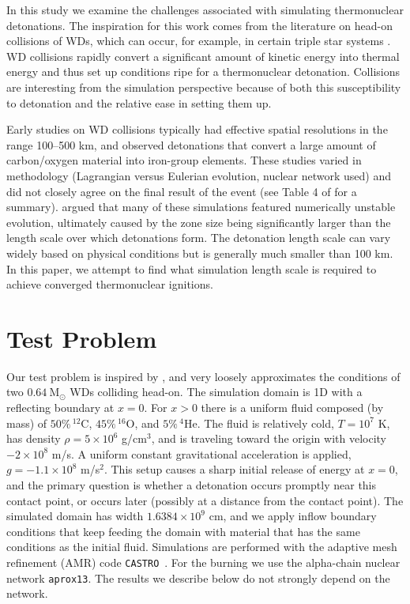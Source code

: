 \documentclass[twocolumn,numberedappendix]{../aastex62}
\newcommand{\msolar}{\mathrm{M}_\odot}
\newcommand{\castro}{\texttt{CASTRO}}
\begin{document}
In this study we examine the challenges associated with simulating thermonuclear detonations.
The inspiration for this work comes from the literature on head-on collisions of WDs,
which can occur, for example, in certain triple star systems \citep{thompson:2011,hamers:2013}.
WD collisions rapidly convert a significant amount of kinetic energy into thermal energy and
thus set up conditions ripe for a thermonuclear detonation. Collisions are interesting
from the simulation perspective because of both this susceptibility to detonation and
the relative ease in setting them up.

Early studies on WD collisions \citep{rosswog:2009,raskin:2010,loren-aguilar:2010,
hawley:2012,garcia-senz:2013} typically had effective spatial resolutions in the
range 100--500 km, and observed detonations that convert a large amount of
carbon/oxygen material into iron-group elements. These studies varied in methodology
(Lagrangian versus Eulerian evolution, nuclear network used) and did not closely agree
on the final result of the event (see Table 4 of \cite{garcia-senz:2013} for a summary).
\cite{kushnir:2013} argued that many of these simulations featured numerically unstable
evolution, ultimately caused by the zone size being significantly larger than the length
scale over which detonations form. The detonation length scale can vary widely based
on physical conditions \citep{seitenzahl:2009,garg:2017} but is generally much
smaller than 100 km. In this paper, we attempt to find what simulation length scale
is required to achieve converged thermonuclear ignitions.



\section{Test Problem}
\label{sec:collisions}

Our test problem is inspired by \cite{kushnir:2013}, and very loosely approximates the
conditions of two $0.64\ \msolar$ WDs colliding head-on. The simulation domain is 1D with a
reflecting boundary at $x = 0$. For $x > 0$ there is a uniform fluid composed (by mass)
of $50\%\, ^{12}$C, $45\%\, ^{16}$O, and $5\%\, ^{4}$He. The fluid is relatively cold,
$T = 10^7$ K, has density $\rho = 5 \times 10^6$ g/cm$^3$, and is traveling toward the
origin with velocity $-2 \times 10^8$ m/s. A uniform constant gravitational acceleration
is applied, $g = -1.1 \times 10^8$ m/s$^{2}$. This setup causes a sharp initial release
of energy at $x = 0$, and the primary question is whether a detonation occurs promptly
near this contact point, or occurs later (possibly at a distance from the contact point).
The simulated domain has width $1.6384 \times 10^9$ cm, and we apply inflow boundary conditions
that keep feeding the domain with material that has the same conditions as the initial fluid.
Simulations are performed with the adaptive mesh refinement (AMR) code \castro\
\citep{castro, astronum:2017}. For the burning we use the alpha-chain nuclear network
\texttt{aprox13}. The results we describe below do not strongly depend on the network.
\end{document}
